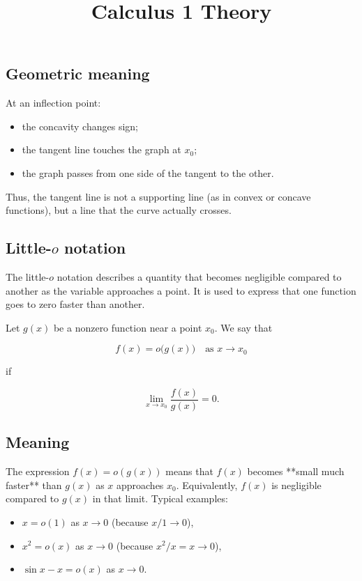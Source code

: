 \documentclass[11pt,a4paper]{article} \usepackage[T1]{fontenc}
\theoremstyle{plain} \newtheorem{theorem}{Theorem} \title{Calculus 1 Theory}
\begin{document}
\subsection*{Geometric meaning}

At an inflection point:

\begin{itemize}
\item the concavity changes sign;
\item the tangent line touches the graph at $x_0$;
\item the graph passes from one side of the tangent to the other.
\end{itemize}

Thus, the tangent line is not a supporting line (as in convex or concave
functions), but a line that the curve actually crosses.

\subsection {Little-$o$ notation}

The little-$o$ notation describes a quantity that becomes negligible compared
to another as the variable approaches a point. It is used to express that one
function goes to zero faster than another.

\begin{definition}
 Let $g(x)$ be a nonzero function near a point $x_0$. We
say that

\[
f(x) = o\bigl(g(x)\bigr) \quad \text{as } x \to x_0
\]

if

\[
\lim_{x\to x_0} \frac{f(x)}{g(x)} = 0.
\]

\end{definition}

\subsection*{Meaning}

The expression $f(x) = o(g(x))$ means that $f(x)$ becomes **small much faster**
than $g(x)$ as $x$ approaches $x_0$. Equivalently, $f(x)$ is negligible
compared to $g(x)$ in that limit. Typical examples:

\begin{itemize}
\item $x = o(1)$ as $x\to 0$ (because $x/1 \to 0$),
\item $x^2 = o(x)$ as $x\to 0$ (because $x^2/x = x \to 0$),
\item $\sin x - x = o(x)$ as $x\to 0$.
\end{itemize}
\end{document}

